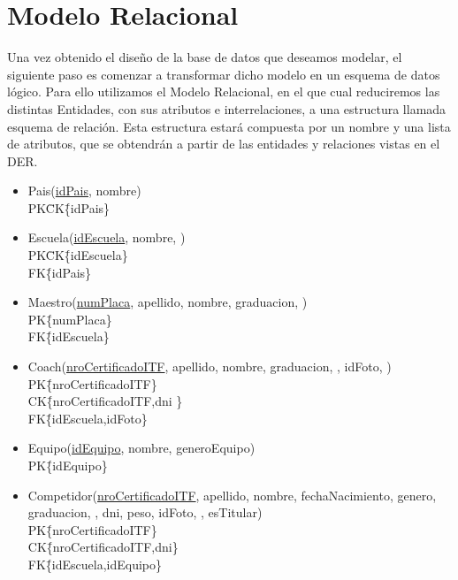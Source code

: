 \newpage
\section{Modelo Relacional}

Una vez obtenido el diseño de la base de datos que deseamos modelar, el siguiente paso es comenzar a transformar dicho modelo en un esquema de datos lógico. Para ello utilizamos el Modelo Relacional, en el que cual reduciremos las distintas Entidades, con sus atributos e interrelaciones, a una estructura llamada esquema de relación. Esta estructura estará compuesta por un nombre y una lista de atributos, que se obtendrán a partir de las entidades y relaciones vistas en el DER.

\begin{itemize}

\item{Pais(\underline{idPais}, nombre)\\
PK\=CK\=\{idPais\}}

\item{Escuela(\underline{idEscuela}, nombre, )\\
PK\=CK\=\{idEscuela\}\\
FK\=\{idPais\}
}

\item{Maestro(\underline{numPlaca}, apellido, nombre, graduacion, )\\
PK\=\{numPlaca\} \\
FK\=\{idEscuela\} \\
}

\item{Coach(\underline{nroCertificadoITF}, apellido, nombre, graduacion, , idFoto, )\\
PK\=\{nroCertificadoITF\} \\
CK\=\{nroCertificadoITF,dni	\} \\
FK\=\{idEscuela,idFoto\} \\
}

\item{Equipo(\underline{idEquipo}, nombre, generoEquipo)\\
PK\=\{idEquipo\} \\
}

\item{Competidor(\underline{nroCertificadoITF}, apellido, nombre, fechaNacimiento, genero, graduacion, , dni, peso, idFoto, , esTitular) \\
PK\=\{nroCertificadoITF\} \\
CK\=\{nroCertificadoITF,dni\} \\
FK\=\{idEscuela,idEquipo\}
}


\end{itemize}
